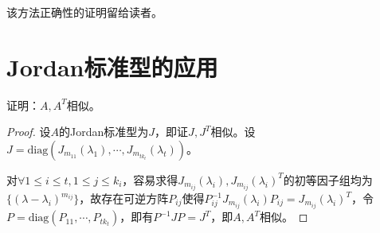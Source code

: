         该方法正确性的证明留给读者。

    \section{Jordan标准型的应用}

        \begin{example}
            证明：$A,A^T$相似。
        \end{example}

        \begin{proof}
            设$A$的Jordan标准型为$J$，即证$J,J^T$相似。设$J=\mathrm{diag}(J_{m_{11}}(\lambda_1),\cdots,J_{m_{tk_t}}(\lambda_t))$。

            对$\forall 1\leq i\leq t,1\leq j\leq k_i$，容易求得$J_{m_{ij}}(\lambda_i),J_{m_{ij}}(\lambda_i)^T$的初等因子组均为$\{(\lambda-\lambda_i)^{m_{ij}}\}$，故存在可逆方阵$P_{ij}$使得$P_{ij}^{-1}J_{m_{ij}}(\lambda_i)P_{ij}=J_{m_{ij}}(\lambda_i)^T$，令$P=\mathrm{diag}(P_{11},\cdots,P_{tk_t})$，即有$P^{-1}JP=J^T$，即$A,A^T$相似。
        \end{proof}

        \begin{example}

        \end{example}
        

